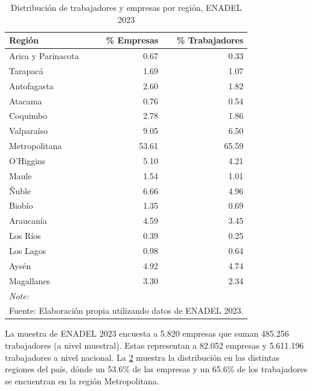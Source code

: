 \documentclass[
]{article}
\begin{document}
\begin{table}[H]
\begin{longtable}[t]{lrr}
\caption{\label{tab:unnamed-chunk-2}Distribución de trabajadores y empresas por región, ENADEL 2023}\\
\toprule
Región & \% Empresas & \% Trabajadores\\
\midrule
Arica y Parinacota & 0.67 & 0.33\\
Tarapacá & 1.69 & 1.07\\
Antofagasta & 2.60 & 1.82\\
Atacama & 0.76 & 0.54\\
Coquimbo & 2.78 & 1.86\\
\addlinespace
Valparaíso & 9.05 & 6.50\\
Metropolitana & 53.61 & 65.59\\
O'Higgins & 5.10 & 4.21\\
Maule & 1.54 & 1.01\\
Ñuble & 6.66 & 4.96\\
\addlinespace
Biobío & 1.35 & 0.69\\
Araucanía & 4.59 & 3.45\\
Los Ríos & 0.39 & 0.25\\
Los Lagos & 0.98 & 0.64\\
Aysén & 4.92 & 4.74\\
\addlinespace
Magallanes & 3.30 & 2.34\\
\bottomrule
\multicolumn{3}{l}{\rule{0pt}{1em}\textit{Note: }}\\
\multicolumn{3}{l}{\rule{0pt}{1em}Fuente: Elaboración propia utilizando datos de ENADEL 2023.}\\
\end{longtable}

\label{tab:distribucion-regiones}\end{table}

La muestra de ENADEL 2023 encuesta a 5.820 empresas que suman 485.256
trabajadores (a nivel muestral). Estas representan a 82.052 empresas y
5.611.196 trabajadores a nivel nacional. La
\ref{tab:distribucion-regiones} muestra la distribución en las distintas
regiones del país, dónde un 53.6\% de las empresas y un 65.6\% de los
trabajadores se encuentran en la región Metropolitana.
\end{document}
